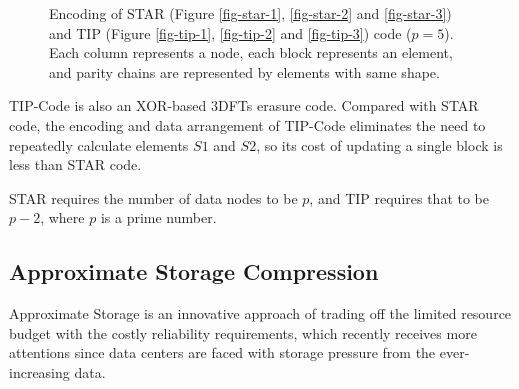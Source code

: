 \documentclass[sigconf]{acmart}
\begin{document}
\begin{figure}[!ht]
\hspace{5pt}
\caption{Encoding of STAR (Figure \ref{fig-star-1}, \ref{fig-star-2} and \ref{fig-star-3}) and TIP (Figure \ref{fig-tip-1}, \ref{fig-tip-2} and \ref{fig-tip-3}) code ($p = 5$). Each column represents a node, each block represents an element, and parity chains are represented by elements with same shape.}
\label{fig-star-tip}
\end{figure}

TIP-Code is also an XOR-based 3DFTs erasure code.
Compared with STAR code, the encoding and data arrangement of TIP-Code eliminates the need to repeatedly calculate elements $S1$ and $S2$, so its cost of updating a single block is less than STAR code.

STAR requires the number of data nodes to be $p$, and TIP requires that to be $p-2$, where $p$ is a prime number.


\subsection{Approximate Storage \textcolor[rgb]{1.00,0.00,0.00}{Compression}}
Approximate Storage is an innovative approach of trading off the limited resource budget with the costly reliability requirements, which recently receives more attentions since data centers are faced with storage pressure from the ever-increasing data.
\end{document}
